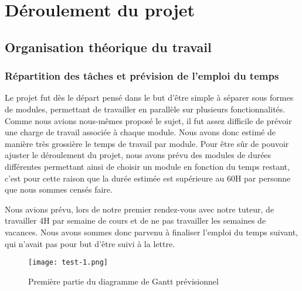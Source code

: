 \graphicspath{{Others/}}

\section{Déroulement du projet}
\subsection{Organisation théorique du travail}
\subsubsection{Répartition des tâches et prévision de l'emploi du temps}
Le projet fut dès le départ pensé dans le but d'être simple à séparer sous formes de modules, permettant de travailler en parallèle sur plusieurs fonctionnalités.
Comme nous avions nous-mêmes proposé le sujet, il fut assez difficile de prévoir une charge de travail associée à chaque module. Nous avons donc estimé 
de manière très grossière le temps de travail par module. Pour être sûr de pouvoir ajuster le déroulement du projet, nous avons prévu des modules de durées différentes permettant ainsi
de choisir un module en fonction du temps restant, c'est pour cette raison que la durée estimée est supérieure au 60H par personne que nous sommes censés faire.
\par
Nous avions prévu, lors de notre premier rendez-vous avec notre tuteur, de travailler 4H par semaine de cours et de ne pas travailler les semaines de vacances.
Nous avons sommes donc parvenu à finaliser l'emploi du temps suivant, qui n'avait pas pour but d'être suivi à la lettre.
\vfill
\begin{figure}[!h]
    \begin{center}
        \texttt{[image: test-1.png]}
        \caption{Première partie du diagramme de Gantt prévisionnel}
    \end{center}
\end{figure}
